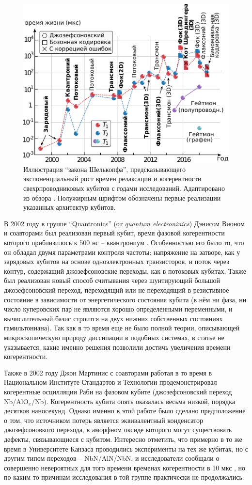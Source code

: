 \documentclass[14pt, a4paper]{extreport}
\numberwithin{equation}{section}
\begin{document}
\begin{figure}
	\centering
	\includegraphics[width=.8\linewidth]{shoelkopfs_law.pdf}
	\caption{Иллюстрация ``закона Шелькопфа'', предсказывающего экспоненциальный рост времен релаксации и когерентности свехрпроводниковых кубитов с годами исследований. Адаптировано из обзора \cite{kjaergaard2020superconducting}. Полужирным шрифтом обозначены первые реализации указанных архитектур кубитов.}
	\label{fig:shoelkopfslaw}
\end{figure}

В 2002 году в группе ``Quantronics'' (от \textit{quantum electroninics}) Дэнисом Вионом и соавторами был реализован первый кубит, время фазовой когерентности которого приблизилось к 500 нс -- квантрониум \cite{vion2002manipulating}. Особенностью его было то, что он обладал двумя параметрами контроля частоты: напряжение на затворе, как у зарядовых кубитов на основе одноэлектронных транзисторов, и поток через контур, содержащий джозефсоновские переходы, как в потоковых кубитах. Также был реализован новый способ считывания через шунтирующий большой джозефсоновский переход, переходящий или не переходящий в резистивное состояние в зависимости от энергетического состояния кубита (в нём ни фаза, ни число куперовских пар не являются хорошо определенными переменными, и вычислительный базис строится на двух нижних собственных состояниях гамильтониана). Так как в то время еще не было полной теории, описывающей микроскопическую природу диссипации в подобных системах, в статье не указывается, какие именно решения позволили достичь увеличения времени когерентности. 

Также в 2002 году Джон Мартинис с соавторами работая в то время в Национальном Институте Стандартов и Технологии продемонстрировал когерентные осцилляции Раби на фазовом кубите \cite{martinis2002rabi} (джозефсоновский переход Nb/AlO$_x$/Nb). Когерентность кубита опять оказалась весьма низкой, порядка десятков наносекунд. Однако именно в этой работе было сделано предположение о том, что источником потерь является эквивалентный конденсатор джозефсоновкого перехода, в аморфном оксиде которого могут существовать дефекты, связывающиеся с кубитом. Интересно отметить, что примерно в то же время в Университете Канзаса проводились эксперименты на тех же кубитах, но с другим типом переходов -- NbN/AlN/NbN, и исследователи сообщали о совершенно невероятных для того времени временах когерентности в 10 мкс \cite{han2001time}, но по каким-то причинам исследования в той группе практически не продолжались.
\end{document}
